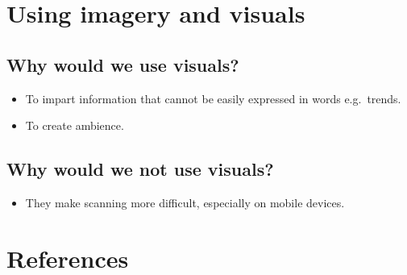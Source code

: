 \documentclass[
  letterpaper,
  DIV=11,
  numbers=noendperiod]{scrreprt}
\providecommand{\tightlist}{%
  \setlength{\itemsep}{0pt}\setlength{\parskip}{0pt}}\usepackage{longtable,booktabs,array}
\newlength{\cslhangindent}
\newlength{\cslentryspacingunit} %
\newenvironment{CSLReferences}[2] %
 {%
  \setlength{\parindent}{0pt}
  \ifodd #1
  \let\oldpar\par
  \def\par{\hangindent=\cslhangindent\oldpar}
  \fi
  \setlength{\parskip}{#2\cslentryspacingunit}
 }%
 {}
\begin{document}

\hypertarget{using-imagery-and-visuals}{%
\chapter{Using imagery and visuals}\label{using-imagery-and-visuals}}

\hypertarget{why-would-we-use-visuals}{%
\section{Why would we use visuals?}\label{why-would-we-use-visuals}}

\begin{itemize}
\item
  To impart information that cannot be easily expressed in words
  e.g.~trends.
\item
  To create ambience.
\end{itemize}

\hypertarget{why-would-we-not-use-visuals}{%
\section{Why would we not use
visuals?}\label{why-would-we-not-use-visuals}}

\begin{itemize}
\tightlist
\item
  They make scanning more difficult, especially on mobile devices.
\end{itemize}


\hypertarget{references}{%
\chapter*{References}\label{references}}


\hypertarget{refs}{}
\begin{CSLReferences}{0}{0}
\end{CSLReferences}
\end{document}

